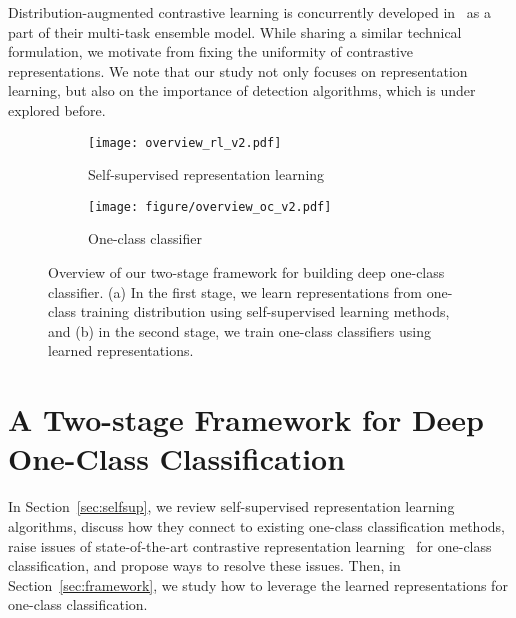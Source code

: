 \documentclass{article} \usepackage{iclr2021_conference,times}
\begin{document}
Distribution-augmented contrastive learning is concurrently developed in~\cite{tack2020csi} as a part of their multi-task ensemble model. While sharing a similar technical formulation, we motivate from fixing the uniformity of contrastive representations.
We note that our study not only focuses on representation learning, but also on the importance of detection algorithms, which is under explored before.





\begin{figure}[t]
    \centering
    \begin{subfigure}{0.54\textwidth}
        \centering
        \texttt{[image: overview\_rl\_v2.pdf]}
        \caption{Self-supervised representation learning}
        \label{fig:overview_rl}
    \end{subfigure}
    \begin{subfigure}{0.44\textwidth}
        \centering
        \texttt{[image: figure/overview\_oc\_v2.pdf]}
        \caption{One-class classifier}
        \label{fig:overview_oc}
    \end{subfigure}
    \vspace{-0.1in}
\caption{Overview of our two-stage framework for building deep one-class classifier. (a) In the first stage, we learn representations from one-class training distribution using self-supervised learning methods, and (b) in the second stage, we train one-class classifiers using learned representations.}
    \label{fig:overview}
    \vspace{-0.1in}
\end{figure}


\vspace{-0.05in}
\section{A Two-stage Framework for Deep One-Class Classification}
\label{sec:representation_learning}
\vspace{-0.05in}
In Section~\ref{sec:selfsup}, we review self-supervised representation learning algorithms, discuss how they connect to existing one-class classification methods, raise issues of state-of-the-art contrastive representation learning~\citep{chen2020simple} for one-class classification, and propose ways to resolve these issues. Then, in Section~\ref{sec:framework}, we study how to leverage the learned representations for one-class classification.
\end{document}

